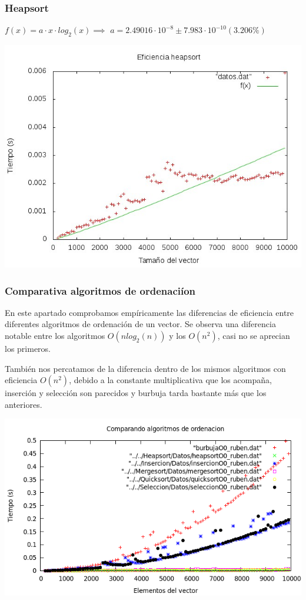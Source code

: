 \documentclass[11pt,spanish]{article} %
\begin{document}
\subsubsection{Heapsort}
$ f(x) = a\cdot x\cdot log_2(x) \implies$
$a               = 2.49016\cdot 10^{-8}      \pm 7.983\cdot 10^{-10}    (3.206\%)$
\begin{center}
\includegraphics[scale=0.55]{../Graficas/Heapsort/heapsortO0_ruben.jpeg}
\end{center}

\subsubsection{Comparativa algoritmos de ordenaci\'ion}

En este apartado comprobamos empíricamente las diferencias de eficiencia entre diferentes algoritmos de ordenación de un vector. Se observa una diferencia notable entre los algoritmos $O(nlog_2(n))$ y los $O(n^2)$, casi no se aprecian los primeros.

También nos percatamos de la diferencia dentro de los mismos algoritmos con eficiencia $O(n^2)$, debido a la constante multiplicativa que los acompaña, inserción y selección son parecidos y burbuja tarda bastante más que los anteriores.

\begin{center}
\includegraphics[scale=0.55]{../Graficas/todos.png}
\end{center}
\end{document}
